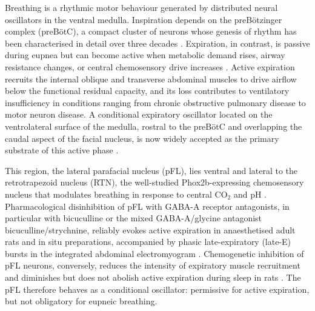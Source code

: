 \documentclass[11pt]{article}
\begin{document}
Breathing is a rhythmic motor behaviour generated by distributed neural
oscillators in the ventral medulla. Inspiration depends on the
preB\"otzinger complex (preB\"otC), a compact cluster of neurons whose
genesis of rhythm has been characterised in detail over three decades
\citep{Smith1991PreBotzinger,Feldman2013Understanding,delNegro2018Breathing}.
Expiration, in contrast, is passive during eupnea but can become active
when metabolic demand rises, airway resistance changes, or central
chemosensory drive increases \citep{Janczewski2006Distinct,Iscoe1998Control}.
Active expiration recruits the internal oblique and transverse abdominal
muscles to drive airflow below the functional residual capacity, and its
loss contributes to ventilatory insufficiency in conditions ranging from
chronic obstructive pulmonary disease to motor neuron disease. A
conditional expiratory oscillator located on the ventrolateral surface of
the medulla, rostral to the preB\"otC and overlapping the caudal aspect of
the facial nucleus, is now widely accepted as the primary substrate of
this active phase
\citep{Pagliardini2011Active,Pisanski2019Parafacial,delNegro2018Breathing}.

This region, the lateral parafacial nucleus (pFL), lies ventral and
lateral to the retrotrapezoid nucleus (RTN), the well-studied
Phox2b-expressing chemosensory nucleus that modulates breathing in
response to central CO$_2$ and pH
\citep{Guyenet2010Central,GuyenetAbbott2013RTN,Takakura2013Phox2b,Marina2010Essential}.
Pharmacological disinhibition of pFL with GABA-A receptor antagonists,
in particular with bicuculline or the mixed GABA-A/glycine antagonist
bicuculline/strychnine, reliably evokes active expiration in anaesthetised
adult rats and in situ preparations, accompanied by phasic
late-expiratory (late-E) bursts in the integrated abdominal electromyogram
\citep{Pagliardini2011Active,Abdala2009Abdominal,Molkov2010Computational,deBritto2017GABAergic}.
Chemogenetic inhibition of pFL neurons, conversely, reduces the intensity
of expiratory muscle recruitment and diminishes but does not abolish active
expiration during sleep in rats
\citep{Huckstepp2015Role,Pisanski2020Parafacial}. The pFL therefore behaves
as a conditional oscillator: permissive for active expiration, but not
obligatory for eupneic breathing.
\end{document}
